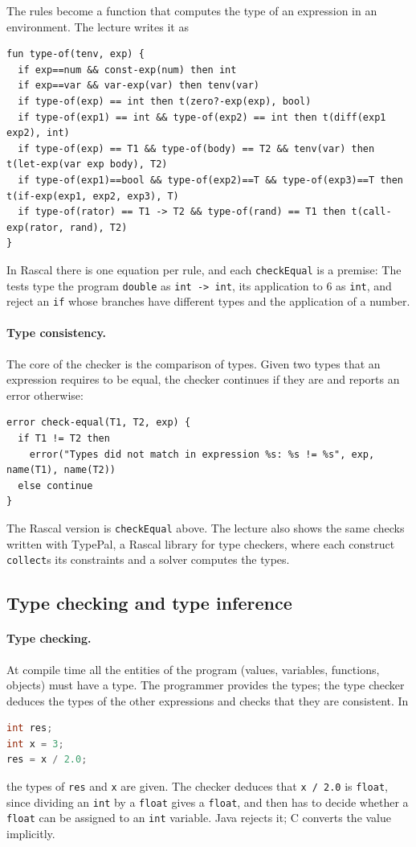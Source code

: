 The rules become a function that computes the type of an expression in an
environment. The lecture writes it as
\begin{lstlisting}
fun type-of(tenv, exp) {
  if exp==num && const-exp(num) then int
  if exp==var && var-exp(var) then tenv(var)
  if type-of(exp) == int then t(zero?-exp(exp), bool)
  if type-of(exp1) == int && type-of(exp2) == int then t(diff(exp1 exp2), int)
  if type-of(exp) == T1 && type-of(body) == T2 && tenv(var) then t(let-exp(var exp body), T2)
  if type-of(exp1)==bool && type-of(exp2)==T && type-of(exp3)==T then t(if-exp(exp1, exp2, exp3), T)
  if type-of(rator) == T1 -> T2 && type-of(rand) == T1 then t(call-exp(rator, rand), T2)
}
\end{lstlisting}
In Rascal there is one equation per rule, and each \texttt{checkEqual} is a
premise:
The tests type the program \texttt{double} as \texttt{int -> int}, its
application to 6 as \texttt{int}, and reject an \texttt{if} whose branches have
different types and the application of a number.

\paragraph{Type consistency.} The core of the checker is the comparison of
types. Given two types that an expression requires to be equal, the checker
continues if they are and reports an error otherwise:
\begin{lstlisting}
error check-equal(T1, T2, exp) {
  if T1 != T2 then
    error("Types did not match in expression %s: %s != %s", exp, name(T1), name(T2))
  else continue
}
\end{lstlisting}
The Rascal version is \texttt{checkEqual} above. The lecture also shows the
same checks written with TypePal, a Rascal library for type checkers, where
each construct \texttt{collect}s its constraints and a solver computes the
types.

\subsection{Type checking and type inference}

\paragraph{Type checking.} At compile time all the entities of the program
(values, variables, functions, objects) must have a type. The programmer
provides the types; the type checker deduces the types of the other
expressions and checks that they are consistent. In
\begin{lstlisting}[language=C]
int res;
int x = 3;
res = x / 2.0;
\end{lstlisting}
the types of \texttt{res} and \texttt{x} are given. The checker deduces that
\texttt{x / 2.0} is \texttt{float}, since dividing an \texttt{int} by a
\texttt{float} gives a \texttt{float}, and then has to decide whether a
\texttt{float} can be assigned to an \texttt{int} variable. Java rejects it; C
converts the value implicitly.

